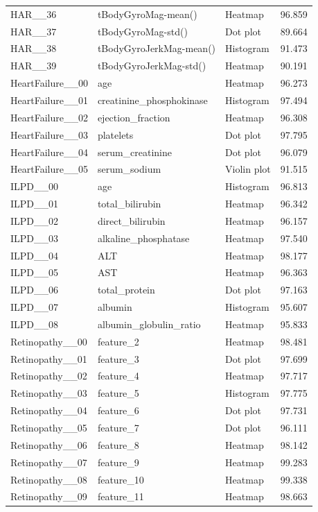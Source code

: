 \begin{longtable}{p{2.7cm}p{5.5cm}p{3.4cm}r}
HAR\_\_36 & tBodyGyroMag-mean() & Heatmap & 96.859\\
HAR\_\_37 & tBodyGyroMag-std() & Dot plot & 89.664\\
HAR\_\_38 & tBodyGyroJerkMag-mean() & Histogram & 91.473\\
HAR\_\_39 & tBodyGyroJerkMag-std() & Heatmap & 90.191\\
HeartFailure\_\_00 & age & Heatmap & 96.273\\
HeartFailure\_\_01 & creatinine\_phosphokinase & Histogram & 97.494\\
HeartFailure\_\_02 & ejection\_fraction & Heatmap & 96.308\\
HeartFailure\_\_03 & platelets & Dot plot & 97.795\\
HeartFailure\_\_04 & serum\_creatinine & Dot plot & 96.079\\
HeartFailure\_\_05 & serum\_sodium & Violin plot & 91.515\\
ILPD\_\_00 & age & Histogram & 96.813\\
ILPD\_\_01 & total\_bilirubin & Heatmap & 96.342\\
ILPD\_\_02 & direct\_bilirubin & Heatmap & 96.157\\
ILPD\_\_03 & alkaline\_phosphatase & Heatmap & 97.540\\
ILPD\_\_04 & ALT & Heatmap & 98.177\\
ILPD\_\_05 & AST & Heatmap & 96.363\\
ILPD\_\_06 & total\_protein & Dot plot & 97.163\\
ILPD\_\_07 & albumin & Histogram & 95.607\\
ILPD\_\_08 & albumin\_globulin\_ratio & Heatmap & 95.833\\
Retinopathy\_\_00 & feature\_2 & Heatmap & 98.481\\
Retinopathy\_\_01 & feature\_3 & Dot plot & 97.699\\
Retinopathy\_\_02 & feature\_4 & Heatmap & 97.717\\
Retinopathy\_\_03 & feature\_5 & Histogram & 97.775\\
Retinopathy\_\_04 & feature\_6 & Dot plot & 97.731\\
Retinopathy\_\_05 & feature\_7 & Dot plot & 96.111\\
Retinopathy\_\_06 & feature\_8 & Heatmap & 98.142\\
Retinopathy\_\_07 & feature\_9 & Heatmap & 99.283\\
Retinopathy\_\_08 & feature\_10 & Heatmap & 99.338\\
Retinopathy\_\_09 & feature\_11 & Heatmap & 98.663\\

\end{longtable}
